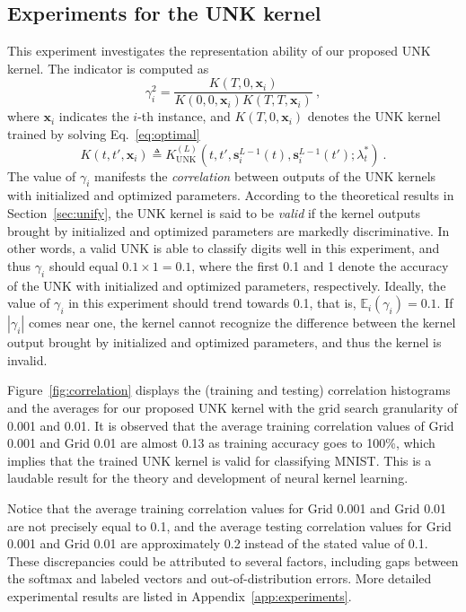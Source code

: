 \documentclass[review,10pt]{JMtemplate}
\begin{document}
\subsection{Experiments for the UNK kernel}
This experiment investigates the representation ability of our proposed UNK kernel. The indicator is computed as
\[
\gamma^2_i = \frac{ K(T,0,\boldsymbol{x}_i) }{ K(0,0,\boldsymbol{x}_i) K(T,T,\boldsymbol{x}_i) } \ ,
\]
where $\boldsymbol{x}_i$ indicates the $i$-th instance, and $K(T,0,\boldsymbol{x}_i)$ denotes the UNK kernel trained by solving Eq.~\eqref{eq:optimal}
\[
K(t,t',\boldsymbol{x}_i) \triangleq K_{\textrm{UNK}}^{(L)} \left( t, t', \boldsymbol{s}^{L-1}_i(t), \boldsymbol{s}^{L-1}_i(t') ; \lambda^*_t\right) \ .
\]
The value of $\gamma_i$ manifests the \emph{correlation} between outputs of the UNK kernels with initialized and optimized parameters. According to the theoretical results in Section~\ref{sec:unify}, the UNK kernel is said to be \emph{valid} if the kernel outputs brought by initialized and optimized parameters are markedly discriminative. In other words, a valid UNK is able to classify digits well in this experiment, and thus $\gamma_i$ should equal $0.1 \times 1 = 0.1$, where the first 0.1 and 1 denote the accuracy of the UNK with initialized and optimized parameters, respectively. Ideally, the value of $\gamma_i$ in this experiment should trend towards 0.1, that is, $\mathbb{E}_i( \gamma_i ) = 0.1$. If $|\gamma_i|$ comes near one, the kernel cannot recognize the difference between the kernel output brought by initialized and optimized parameters, and thus the kernel is invalid.



Figure~\ref{fig:correlation} displays the (training and testing) correlation histograms and the averages for our proposed UNK kernel with the grid search granularity of 0.001 and 0.01. It is observed that the average training correlation values of Grid 0.001 and Grid 0.01 are almost 0.13 as training accuracy goes to 100\%, which implies that the trained UNK kernel is valid for classifying MNIST. This is a laudable result for the theory and development of neural kernel learning.

Notice that the average training correlation values for Grid 0.001 and Grid 0.01 are not precisely equal to 0.1, and the average testing correlation values for Grid 0.001 and Grid 0.01 are approximately 0.2 instead of the stated value of 0.1. These discrepancies could be attributed to several factors, including gaps between the softmax and labeled vectors and out-of-distribution errors. More detailed experimental results are listed in Appendix~\ref{app:experiments}.
\end{document}
